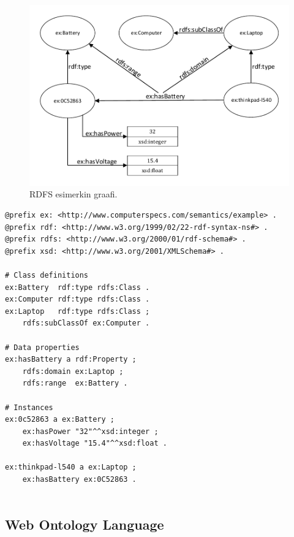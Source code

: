 \documentclass[finnish, 12pt, a4paper, elec, utf8, pdfa, online]{aaltothesis}
\begin{document}
{\begin{figure}[htb]
\centering
\includegraphics[width=13cm]{images/laptop.pdf}
\vspace{-0.75cm}
\caption{RDFS esimerkin graafi.}
\label{images/laptop}
\end{figure}
\vskip 0.3cm
\begin{lstlisting}[style=codeblock,caption={RDFS esimerkki.},captionpos=b,label={rdfs_esim}]
@prefix ex: <http://www.computerspecs.com/semantics/example> .
@prefix rdf: <http://www.w3.org/1999/02/22-rdf-syntax-ns#> .
@prefix rdfs: <http://www.w3.org/2000/01/rdf-schema#> .
@prefix xsd: <http://www.w3.org/2001/XMLSchema#> .

# Class definitions
ex:Battery  rdf:type rdfs:Class .
ex:Computer rdf:type rdfs:Class .
ex:Laptop   rdf:type rdfs:Class ;
    rdfs:subClassOf ex:Computer .

# Data properties
ex:hasBattery a rdf:Property ;
    rdfs:domain ex:Laptop ;
    rdfs:range  ex:Battery .

# Instances
ex:0c52863 a ex:Battery ;
    ex:hasPower "32"^^xsd:integer ;
    ex:hasVoltage "15.4"^^xsd:float .

ex:thinkpad-l540 a ex:Laptop ;
    ex:hasBattery ex:0C52863 .


\end{lstlisting}

\subsection{Web Ontology Language}

}
\end{document}
